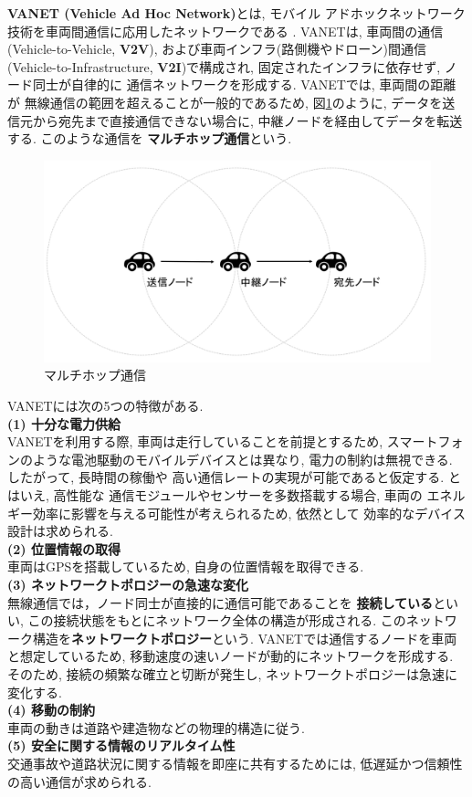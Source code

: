 \textbf{VANET (Vehicle Ad Hoc Network)}とは, モバイル
アドホックネットワーク技術を車両間通信に応用したネットワークである
\cite{adhoc,vanet}. VANETは, 車両間の通信(Vehicle-to-Vehicle, 
\textbf{V2V}), および車両インフラ(路側機やドローン)間通信
(Vehicle-to-Infrastructure, \textbf{V2I})\cite{drone}で構成され, 
固定されたインフラに依存せず, ノード同士が自律的に
通信ネットワークを形成する. VANETでは, 車両間の距離が
無線通信の範囲を超えることが一般的であるため, 図\ref{fig:vanet}のように, 
データを送信元から宛先まで直接通信できない場合に, 
中継ノードを経由してデータを転送する. このような通信を
\textbf{マルチホップ通信}という.

\begin{figure}
  \centering
  \includegraphics[scale=0.6]{figures/vanet.png}
  \caption{マルチホップ通信}
  \label{fig:vanet}
\end{figure}

VANETには次の5つの特徴がある.\\[0.5em]
\noindent\textbf{(1) 十分な電力供給}\\
\indent VANETを利用する際, 車両は走行していることを前提とするため, 
スマートフォンのような電池駆動のモバイルデバイスとは異なり, 
電力の制約は無視できる. したがって, 長時間の稼働や
高い通信レートの実現が可能であると仮定する. とはいえ, 高性能な
通信モジュールやセンサーを多数搭載する場合, 車両の
エネルギー効率に影響を与える可能性が考えられるため, 依然として
効率的なデバイス設計は求められる.\\[1em]
\noindent\textbf{(2) 位置情報の取得}\\
\indent 車両はGPSを搭載しているため, 自身の位置情報を取得できる.\\[1em]
\noindent\textbf{(3) ネットワークトポロジーの急速な変化}\\
\indent 無線通信では，ノード同士が直接的に通信可能であることを
\textbf{接続している}といい, この接続状態をもとにネットワーク全体の構造が形成される. 
このネットワーク構造を\textbf{ネットワークトポロジー}という. 
VANETでは通信するノードを車両と想定しているため, 
移動速度の速いノードが動的にネットワークを形成する. 
そのため, 接続の頻繁な確立と切断が発生し, 
ネットワークトポロジーは急速に変化する. \\[1em]
\noindent\textbf{(4) 移動の制約}\\
\indent 車両の動きは道路や建造物などの物理的構造に従う.\\[1em]
\noindent\textbf{(5) 安全に関する情報のリアルタイム性}\\
\indent 交通事故や道路状況に関する情報を即座に共有するためには, 
低遅延かつ信頼性の高い通信が求められる.\\

